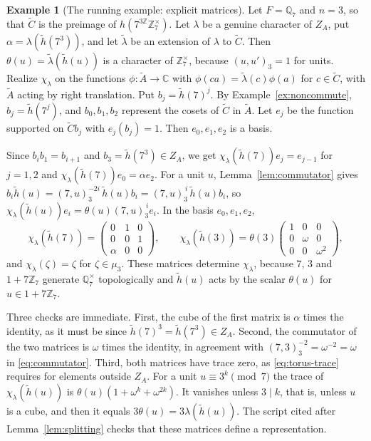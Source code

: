\documentclass[12pt,letterpaper]{article}
\numberwithin{equation}{section}
\theoremstyle{plain}
\theoremstyle{definition}
\newtheorem{example}[theorem]{Example}
\theoremstyle{remark}
\newcommand{\At}{\widetilde A}
\newcommand{\Ct}{\widetilde C}
\newcommand{\hl}{\tilde h}
\newcommand{\Cc}{\mathbb C}
\newcommand{\Zz}{\mathbb Z}
\newcommand{\Qq}{\mathbb Q}
\newcommand{\ZA}{Z_A}
\begin{document}
\begin{example}[The running example: explicit matrices]\label{ex:matrices}
Let $F=\Qq_7$ and $n=3$, so that $\Ct$ is the preimage of
$h(7^{3\Zz}\Zz_7^\times)$. Let $\lambda$ be a genuine character of $\ZA$,
put $\alpha=\lambda(\hl(7^3))$, and let $\tilde\lambda$ be an extension
of $\lambda$ to $\Ct$. Then $\theta(u)=\tilde\lambda(\hl(u))$ is a
character of $\Zz_7^\times$, because $(u,u')_3=1$ for units. Realize
$\chi_\lambda$ on the functions $\phi:\At\to\Cc$ with
$\phi(ca)=\tilde\lambda(c)\phi(a)$ for $c\in\Ct$, with $\At$ acting by
right translation. Put $b_j=\hl(7)^j$. By Example~\ref{ex:noncommute},
$b_j=\hl(7^j)$, and $b_0,b_1,b_2$ represent the cosets of $\Ct$ in
$\At$. Let $e_j$ be the function supported on $\Ct b_j$ with
$e_j(b_j)=1$. Then $e_0,e_1,e_2$ is a basis.

Since $b_ib_1=b_{i+1}$ and $b_3=\hl(7^3)\in\ZA$, we get
$\chi_\lambda(\hl(7))e_j=e_{j-1}$ for $j=1,2$ and
$\chi_\lambda(\hl(7))e_0=\alpha e_2$. For a unit $u$,
Lemma~\ref{lem:commutator} gives
$b_i\hl(u)=(7,u)_3^{-2i}\,\hl(u)b_i=(7,u)_3^{\,i}\,\hl(u)b_i$, so
$\chi_\lambda(\hl(u))e_i=\theta(u)(7,u)_3^{\,i}e_i$. In the basis
$e_0,e_1,e_2$,
\[
\chi_\lambda(\hl(7))=\begin{pmatrix}0&1&0\\0&0&1\\ \alpha&0&0\end{pmatrix},
\qquad
\chi_\lambda(\hl(3))=\theta(3)\begin{pmatrix}1&0&0\\0&\omega&0\\0&0&\omega^2
\end{pmatrix},
\]
and $\chi_\lambda(\zeta)=\zeta$ for $\zeta\in\mu_3$. These matrices
determine $\chi_\lambda$, because $7$, $3$ and $1+7\Zz_7$ generate
$\Qq_7^\times$ topologically and $\hl(u)$ acts by the scalar $\theta(u)$
for $u\in1+7\Zz_7$.

Three checks are immediate. First, the cube of the first matrix is
$\alpha$ times the identity, as it must be since
$\hl(7)^3=\hl(7^3)\in\ZA$. Second, the commutator of the two matrices is
$\omega$ times the identity, in agreement with
$(7,3)_3^{-2}=\omega^{-2}=\omega$ in \eqref{eq:commutator}. Third, both
matrices have trace zero, as \eqref{eq:torus-trace} requires for
elements outside $\ZA$. For a unit $u\equiv3^k\pmod7$ the trace of
$\chi_\lambda(\hl(u))$ is $\theta(u)(1+\omega^k+\omega^{2k})$. It
vanishes unless $3\mid k$, that is, unless $u$ is a cube, and then it
equals $3\theta(u)=3\lambda(\hl(u))$. The script cited after
Lemma~\ref{lem:splitting} checks that these matrices define a
representation.
\end{example}
\end{document}
